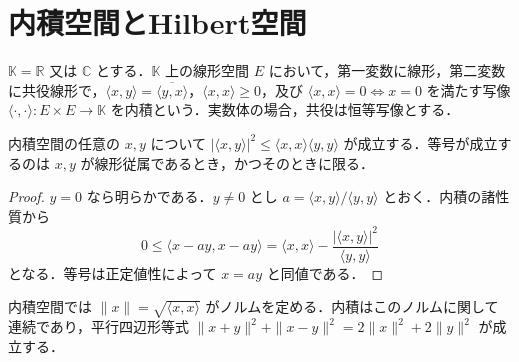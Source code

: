 \section{内積空間とHilbert空間}
\begin{defn}[内積空間]
$\mathbb K=\mathbb R$ 又は $\mathbb C$ とする．$\mathbb K$ 上の線形空間 $E$ において，第一変数に線形，第二変数に共役線形で，$\langle x,y\rangle=\overline{\langle y,x\rangle}$，$\langle x,x\rangle\geq0$，及び $\langle x,x\rangle=0\Leftrightarrow x=0$ を満たす写像 $\langle\cdot,\cdot\rangle:E\times E\to\mathbb K$ を内積という．実数体の場合，共役は恒等写像とする．
\end{defn}
\begin{prop}
内積空間の任意の $x,y$ について $|\langle x,y\rangle|^2\leq\langle x,x\rangle\langle y,y\rangle$ が成立する．等号が成立するのは $x,y$ が線形従属であるとき，かつそのときに限る．
\end{prop}
\begin{proof}
$y=0$ なら明らかである．$y\ne0$ とし $a=\langle x,y\rangle/\langle y,y\rangle$ とおく．内積の諸性質から
\[
0\leq\langle x-ay,x-ay\rangle=\langle x,x\rangle-\frac{|\langle x,y\rangle|^2}{\langle y,y\rangle}
\]
となる．等号は正定値性によって $x=ay$ と同値である．
\end{proof}
\begin{prop}[内積から導かれるノルム]
内積空間では $\|x\|=\sqrt{\langle x,x\rangle}$ がノルムを定める．内積はこのノルムに関して連続であり，平行四辺形等式 $\|x+y\|^2+\|x-y\|^2=2\|x\|^2+2\|y\|^2$ が成立する．
\end{prop}
